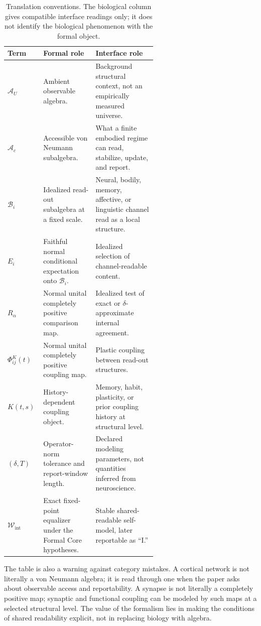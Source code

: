 \documentclass[12pt]{article}
\theoremstyle{definition}
\theoremstyle{remark}
\newcommand{\AU}{\mathcal A_U}
\newcommand{\Ac}{\mathcal A_c}
\newcommand{\Wint}{\mathcal W_{\mathrm{int}}}
\begin{document}
\begin{table}[H]
\centering
\small
\begin{tabularx}{0.98\linewidth}{P{0.24\linewidth}P{0.35\linewidth}Y}
\toprule
\textbf{Term} & \textbf{Formal role} & \textbf{Interface role} \\
\midrule
\(\AU\) &
Ambient observable algebra. &
Background structural context, not an empirically measured universe. \\
\(\Ac\) &
Accessible von Neumann subalgebra. &
What a finite embodied regime can read, stabilize, update, and report. \\
\(\mathcal B_i\) &
Idealized read-out subalgebra at a fixed scale. &
Neural, bodily, memory, affective, or linguistic channel read as a local structure. \\
\(E_i\) &
Faithful normal conditional expectation onto \(\mathcal B_i\). &
Idealized selection of channel-readable content. \\
\(R_\alpha\) &
Normal unital completely positive comparison map. &
Idealized test of exact or \(\delta\)-approximate internal agreement. \\
\(\Phi_{ij}^{K}(t)\) &
Normal unital completely positive coupling map. &
Plastic coupling between read-out structures. \\
\(K(t,s)\) &
History-dependent coupling object. &
Memory, habit, plasticity, or prior coupling history at structural level. \\
\((\delta,T)\) &
Operator-norm tolerance and report-window length. &
Declared modeling parameters, not quantities inferred from neuroscience. \\
\(\Wint\) &
Exact fixed-point equalizer under the Formal Core hypotheses. &
Stable shared-readable self-model, later reportable as ``I.'' \\
\bottomrule
\end{tabularx}
\caption{Translation conventions. The biological column gives
compatible interface readings only; it does not identify the biological
phenomenon with the formal object.}
\end{table}

The table is also a warning against category mistakes. A cortical
network is not literally a von Neumann algebra; it is read through one
when the paper asks about observable access and reportability. A
synapse is not literally a completely positive map; synaptic and
functional coupling can be modeled by such maps at a selected structural
level. The value of the formalism lies in making the conditions of
shared readability explicit, not in replacing biology with algebra.
\end{document}

